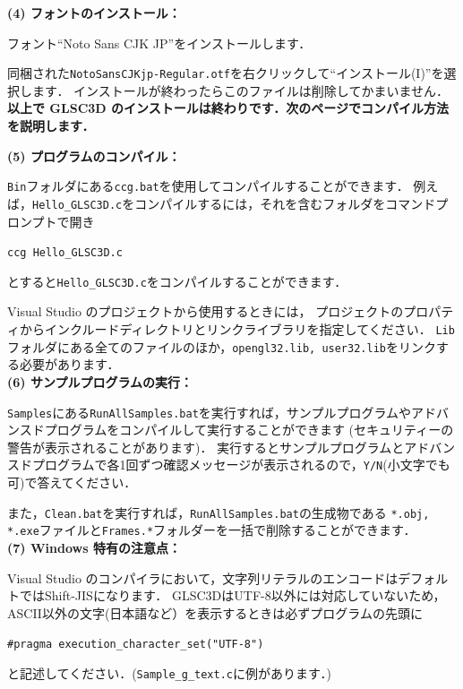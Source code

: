 \documentclass[platex,a4paper,12pt]{jsarticle}%
\begin{document}
\noindent \textbf{(4) フォントのインストール：} 

フォント``Noto Sans CJK JP''をインストールします．

同梱された\verb|NotoSansCJKjp-Regular.otf|を右クリックして``インストール(I)''を選択します．
インストールが終わったらこのファイルは削除してかまいません．\\

\textbf{以上で GLSC3D のインストールは終わりです．次のページでコンパイル方法を説明します．}

\newpage
\noindent \textbf{(5) プログラムのコンパイル：} 

\verb|Bin|フォルダにある\verb|ccg.bat|を使用してコンパイルすることができます．
例えば，\verb|Hello_GLSC3D.c|をコンパイルするには，それを含むフォルダをコマンドプロンプトで開き
\begin{center}
	\verb|ccg Hello_GLSC3D.c|
\end{center}
とすると\verb|Hello_GLSC3D.c|をコンパイルすることができます．

Visual Studio のプロジェクトから使用するときには，
プロジェクトのプロパティからインクルードディレクトリとリンクライブラリを指定してください．
\verb|Lib|フォルダにある全てのファイルのほか，\verb|opengl32.lib, user32.lib|をリンクする必要があります．\\

\noindent \textbf{(6) サンプルプログラムの実行：} 

\verb|Samples|にある\verb|RunAllSamples.bat|を実行すれば，サンプルプログラムやアドバンスドプログラムをコンパイルして実行することができます
(セキュリティーの警告が表示されることがあります)．
実行するとサンプルプログラムとアドバンスドプログラムで各1回ずつ確認メッセージが表示されるので，\verb|Y/N|(小文字でも可)で答えてください．

また，\verb|Clean.bat|を実行すれば，\verb|RunAllSamples.bat|の生成物である
\verb|*.obj, *.exe|ファイルと\verb|Frames.*|フォルダーを一括で削除することができます．\\

\noindent \textbf{(7) Windows 特有の注意点：} 

Visual Studio のコンパイラにおいて，文字列リテラルのエンコードはデフォルトではShift-JISになります．
GLSC3DはUTF-8以外には対応していないため，ASCII以外の文字(日本語など）を表示するときは必ずプログラムの先頭に
\begin{center}
	\verb|#pragma execution_character_set("UTF-8")|
\end{center}
と記述してください．(\verb|Sample_g_text.c|に例があります．)
\end{document}
